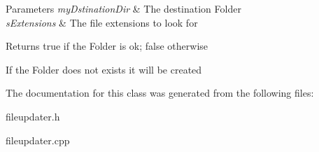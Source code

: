 \begin{DoxyParams}{Parameters}
{\em my\+Dstination\+Dir} & The destination Folder \\
\hline
{\em s\+Extensions} & The file extensions to look for \\
\hline
\end{DoxyParams}
\begin{DoxyReturn}{Returns}
true if the Folder is ok; false otherwise
\end{DoxyReturn}
If the Folder does not exists it will be created 

The documentation for this class was generated from the following files\+:\begin{DoxyCompactItemize}
\item 
fileupdater.\+h\item 
fileupdater.\+cpp\end{DoxyCompactItemize}
